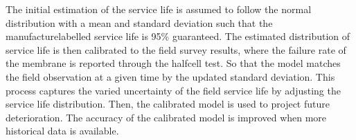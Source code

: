 \documentclass[letterpaper,10pt,english]{sphinxmanual}
\begin{document}
\sphinxAtStartPar
The initial estimation of the service life is assumed to follow the normal distribution with a mean and standard deviation such that the manufacture\sphinxhyphen{}labelled service life is 95\% guaranteed.
The estimated distribution of service life is then calibrated to the field survey results,
where the failure rate of the membrane is reported through the half\sphinxhyphen{}cell test.
So that the model matches the field observation at a given time by the updated standard deviation.
This process captures the varied uncertainty of the field service life by adjusting the service life distribution.
Then, the calibrated model is used to project future deterioration. The accuracy of the calibrated model is improved when more historical data is available.
\end{document}
